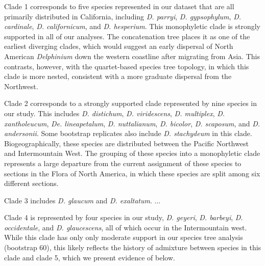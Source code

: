 \documentclass[11pt]{article}
\begin{document}
Clade 1 corresponds to five species represented in our dataset that are 
all primarily distributed in California, including \emph{D. parryi}, 
\emph{D. gypsophylum}, \emph{D. cardinale}, \emph{D. californicum}, and
\emph{D. hesperium}. This monophyletic clade is strongly supported in all
of our analyses. The concatenation tree places it as one of the earliest 
diverging clades, which would suggest an early dispersal of North American
\emph{Delphinium} down the western coastline after migrating from Asia. This
contrasts, however, with the quartet-based species tree topology, in which
this clade is more nested, consistent with a more graduate dispersal from the
Northwest. 


Clade 2 corresponds to a strongly supported clade represented by nine 
species in our study. This includes \emph{D. distichum}, \emph{D. viridescens},
\emph{D. multiplex}, \emph{D. xantholeucum}, \emph{De. lineapetalum}, 
\emph{D. nuttalianum}, \emph{D. bicolor}, \emph{D. scaposum}, and
\emph{D. andersonii}. Some bootstrap replicates also include 
\emph{D. stachydeum} in this clade. Biogeographically, these species are distributed
between the Pacific Northwest and Intermountain West. The grouping
of these species into a monophyletic clade represents a large departure
from the current assignment of these species to sections in the Flora of
North America, in which these species are split among six different sections.


Clade 3 includes \emph{D. glaucum} and \emph{D. exaltatum}. ...


Clade 4 is represented by four species in our study, 
\emph{D. geyeri}, \emph{D. barbeyi}, \emph{D. occidentale}, and 
\emph{D. glaucescens}, all of which occur in the Intermountain west. 
While this clade has only only moderate support in our species
tree analysis (bootstrap 60), this likely reflects the history of admixture
between species in this clade and clade 5, which we present evidence 
of below.
\end{document}
